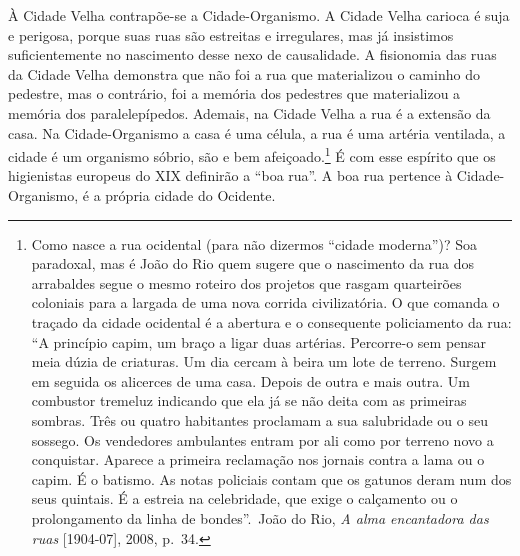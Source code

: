 À Cidade Velha contrapõe-se a Cidade-Organismo. A Cidade Velha carioca é
suja e perigosa, porque suas ruas são estreitas e irregulares, mas já
insistimos suficientemente no nascimento desse nexo de causalidade. A
fisionomia das ruas da Cidade Velha demonstra que não foi a rua que
materializou o caminho do pedestre, mas o contrário, foi a memória dos
pedestres que materializou a memória dos paralelepípedos. Ademais, na
Cidade Velha a rua é a extensão da casa. Na Cidade-Organismo a casa é
uma célula, a rua é uma artéria ventilada, a cidade é um organismo
sóbrio, são e bem afeiçoado.\footnote{Como nasce a rua ocidental (para
  não dizermos ``cidade moderna'')? Soa paradoxal, mas é João do Rio
  quem sugere que o nascimento da rua dos arrabaldes segue o mesmo
  roteiro dos projetos que rasgam quarteirões coloniais para a largada
  de uma nova corrida civilizatória. O que comanda o traçado da cidade
  ocidental é a abertura e o consequente policiamento da rua: ``A
  princípio capim, um braço a ligar duas artérias. Percorre-o sem pensar
  meia dúzia de criaturas. Um dia cercam à beira um lote de terreno.
  Surgem em seguida os alicerces de uma casa. Depois de outra e mais
  outra. Um combustor tremeluz indicando que ela já se não deita com as
  primeiras sombras. Três ou quatro habitantes proclamam a sua
  salubridade ou o seu sossego. Os vendedores ambulantes entram por ali
  como por terreno novo a conquistar. Aparece a primeira reclamação nos
  jornais contra a lama ou o capim. É o batismo. As notas policiais
  contam que os gatunos deram num dos seus quintais. É a estreia na
  celebridade, que exige o calçamento ou o prolongamento da linha de
  bondes''.~João do Rio, \textit{A alma encantadora das ruas}
  {[}1904-07{]}, 2008, p.~34.} É com esse espírito que os higienistas
europeus do XIX definirão a ``boa rua''. A boa rua pertence à
Cidade-Organismo, é a própria cidade do Ocidente.

